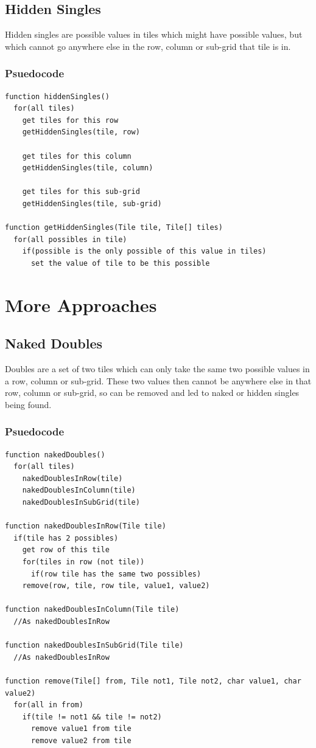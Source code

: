 \documentclass[10pt,letterpaper]{article}
\begin{document}
      \subsection{Hidden Singles}
	Hidden singles are possible values in tiles which might have possible values, but which cannot go anywhere else in the row, column or sub-grid that tile is in.
	
	\subsubsection{Psuedocode}
	  \begin{verbatim}
function hiddenSingles()
  for(all tiles)
    get tiles for this row
    getHiddenSingles(tile, row)
    
    get tiles for this column
    getHiddenSingles(tile, column)
    
    get tiles for this sub-grid
    getHiddenSingles(tile, sub-grid)    

function getHiddenSingles(Tile tile, Tile[] tiles)
  for(all possibles in tile)
    if(possible is the only possible of this value in tiles)
      set the value of tile to be this possible
	  \end{verbatim}
	
    \section{More Approaches}
      \subsection{Naked Doubles}
	Doubles are a set of two tiles which can only take the same two possible values in a row, column or sub-grid. These two values then cannot be anywhere else in that row, column or sub-grid, so can be removed and led to naked or hidden singles being found.
      
	\subsubsection{Psuedocode}
	  \begin{verbatim}
function nakedDoubles()
  for(all tiles)
    nakedDoublesInRow(tile)
    nakedDoublesInColumn(tile)
    nakedDoublesInSubGrid(tile)

function nakedDoublesInRow(Tile tile)
  if(tile has 2 possibles)
    get row of this tile
    for(tiles in row (not tile))
      if(row tile has the same two possibles)
	remove(row, tile, row tile, value1, value2)

function nakedDoublesInColumn(Tile tile)
  //As nakedDoublesInRow

function nakedDoublesInSubGrid(Tile tile)
  //As nakedDoublesInRow	

function remove(Tile[] from, Tile not1, Tile not2, char value1, char value2)
  for(all in from)
    if(tile != not1 && tile != not2)
      remove value1 from tile
      remove value2 from tile
	  \end{verbatim}
	  
\end{document}
